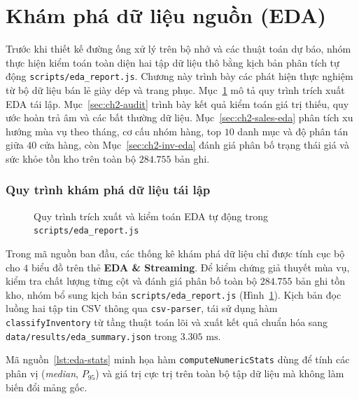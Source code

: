 \part{Khám phá dữ liệu nguồn (EDA)}
\label{part:ch2}

Trước khi thiết kế đường ống xử lý trên bộ nhớ và các thuật toán dự báo, nhóm thực hiện kiểm toán toàn diện hai tập dữ liệu thô bằng kịch bản phân tích tự động \texttt{scripts/eda_report.js}. Chương này trình bày các phát hiện thực nghiệm từ bộ dữ liệu bán lẻ giày dép và trang phục. Mục~\ref{sec:ch2-script} mô tả quy trình trích xuất EDA tái lập. Mục~\ref{sec:ch2-audit} trình bày kết quả kiểm toán giá trị thiếu, quy ước hoàn trả âm và các bất thường dữ liệu. Mục~\ref{sec:ch2-sales-eda} phân tích xu hướng mùa vụ theo tháng, cơ cấu nhóm hàng, top $10$ danh mục và độ phân tán giữa $40$ cửa hàng, còn Mục~\ref{sec:ch2-inv-eda} đánh giá phân bố trạng thái giá và sức khỏe tồn kho trên toàn bộ $284.755$ bản ghi.

\section{Quy trình khám phá dữ liệu tái lập}
\label{sec:ch2-script}

\begin{figure}[H]
	\centering
	\caption{Quy trình trích xuất và kiểm toán EDA tự động trong \texttt{scripts/eda\_report.js}}
	\label{fig:eda_pipeline}
\end{figure}

Trong mã nguồn ban đầu, các thống kê khám phá dữ liệu chỉ được tính cục bộ cho $4$ biểu đồ trên thẻ \textbf{EDA \& Streaming}. Để kiểm chứng giả thuyết mùa vụ, kiểm tra chất lượng từng cột và đánh giá phân bố toàn bộ $284.755$ bản ghi tồn kho, nhóm bổ sung kịch bản \texttt{scripts/eda_report.js} (Hình~\ref{fig:eda_pipeline}). Kịch bản đọc luồng hai tập tin CSV thông qua \texttt{csv-parser}, tái sử dụng hàm \texttt{classifyInventory} từ tầng thuật toán lõi và xuất kết quả chuẩn hóa sang \texttt{data/results/eda_summary.json} trong $3.305\text{ ms}$.

\medskip

Mã nguồn~\ref{lst:eda-stats} minh họa hàm \texttt{computeNumericStats} dùng để tính các phân vị (\textit{median}, $P_{95}$) và giá trị cực trị trên toàn bộ tập dữ liệu mà không làm biến đổi mảng gốc.

